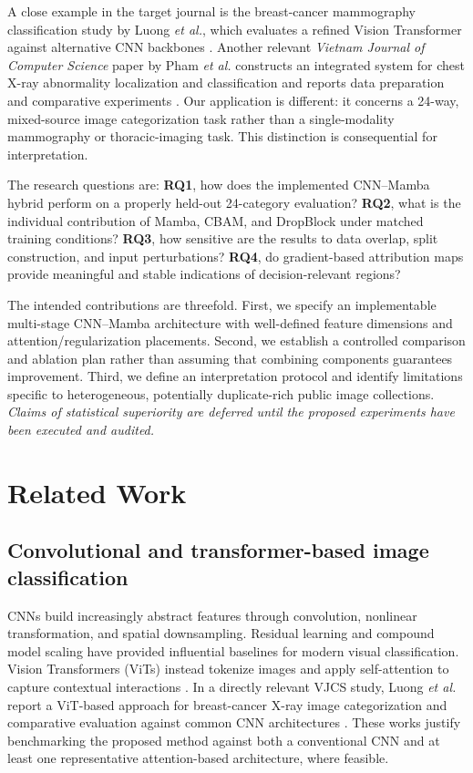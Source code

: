 \documentclass[11pt,a4paper]{article}
\begin{document}
A close example in the target journal is the breast-cancer mammography classification study by Luong \emph{et al.}, which evaluates a refined Vision Transformer against alternative CNN backbones \citep{luong2025breast}. Another relevant \emph{Vietnam Journal of Computer Science} paper by Pham \emph{et al.} constructs an integrated system for chest X-ray abnormality localization and classification and reports data preparation and comparative experiments \citep{pham2023chest}. Our application is different: it concerns a 24-way, mixed-source image categorization task rather than a single-modality mammography or thoracic-imaging task. This distinction is consequential for interpretation.

The research questions are: \textbf{RQ1}, how does the implemented CNN--Mamba hybrid perform on a properly held-out 24-category evaluation? \textbf{RQ2}, what is the individual contribution of Mamba, CBAM, and DropBlock under matched training conditions? \textbf{RQ3}, how sensitive are the results to data overlap, split construction, and input perturbations? \textbf{RQ4}, do gradient-based attribution maps provide meaningful and stable indications of decision-relevant regions?

The intended contributions are threefold. First, we specify an implementable multi-stage CNN--Mamba architecture with well-defined feature dimensions and attention/regularization placements. Second, we establish a controlled comparison and ablation plan rather than assuming that combining components guarantees improvement. Third, we define an interpretation protocol and identify limitations specific to heterogeneous, potentially duplicate-rich public image collections. \emph{Claims of statistical superiority are deferred until the proposed experiments have been executed and audited.}

\section{Related Work}\label{sec:related}
\subsection{Convolutional and transformer-based image classification}
CNNs build increasingly abstract features through convolution, nonlinear transformation, and spatial downsampling. Residual learning \citep{he2016resnet} and compound model scaling \citep{tan2019efficientnet} have provided influential baselines for modern visual classification. Vision Transformers (ViTs) instead tokenize images and apply self-attention to capture contextual interactions \citep{dosovitskiy2021vit}. In a directly relevant VJCS study, Luong \emph{et al.} report a ViT-based approach for breast-cancer X-ray image categorization and comparative evaluation against common CNN architectures \citep{luong2025breast}. These works justify benchmarking the proposed method against both a conventional CNN and at least one representative attention-based architecture, where feasible.
\end{document}
